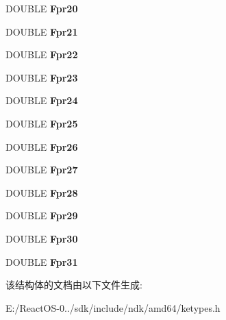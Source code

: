 \begin{DoxyCompactItemize}
D\+O\+U\+B\+LE {\bfseries Fpr20}
\item 
\mbox{\label{struct___k_e_x_c_e_p_t_i_o_n___f_r_a_m_e_a18daaaf2f1d4458a611526f331120393}} 
D\+O\+U\+B\+LE {\bfseries Fpr21}
\item 
\mbox{\label{struct___k_e_x_c_e_p_t_i_o_n___f_r_a_m_e_a5d1655c14daa3806512499e17ab2338f}} 
D\+O\+U\+B\+LE {\bfseries Fpr22}
\item 
\mbox{\label{struct___k_e_x_c_e_p_t_i_o_n___f_r_a_m_e_aa6454545c3d515529a9057ac41a22309}} 
D\+O\+U\+B\+LE {\bfseries Fpr23}
\item 
\mbox{\label{struct___k_e_x_c_e_p_t_i_o_n___f_r_a_m_e_a2157cc243c0ef31b487a44dc873d89eb}} 
D\+O\+U\+B\+LE {\bfseries Fpr24}
\item 
\mbox{\label{struct___k_e_x_c_e_p_t_i_o_n___f_r_a_m_e_ad96c0a9b514e2a08e14670d0f646b35a}} 
D\+O\+U\+B\+LE {\bfseries Fpr25}
\item 
\mbox{\label{struct___k_e_x_c_e_p_t_i_o_n___f_r_a_m_e_aad4cce522073605a0a951f5fd4324708}} 
D\+O\+U\+B\+LE {\bfseries Fpr26}
\item 
\mbox{\label{struct___k_e_x_c_e_p_t_i_o_n___f_r_a_m_e_a2e315c2f5de4ca7c23eb2e715a80148f}} 
D\+O\+U\+B\+LE {\bfseries Fpr27}
\item 
\mbox{\label{struct___k_e_x_c_e_p_t_i_o_n___f_r_a_m_e_aa5708ad7c1ae6ae4f048dd9e1714aa3b}} 
D\+O\+U\+B\+LE {\bfseries Fpr28}
\item 
\mbox{\label{struct___k_e_x_c_e_p_t_i_o_n___f_r_a_m_e_a46b99f81484526b855c5267eaafe59fc}} 
D\+O\+U\+B\+LE {\bfseries Fpr29}
\item 
\mbox{\label{struct___k_e_x_c_e_p_t_i_o_n___f_r_a_m_e_a73e709a5a8ec2157ecd3990a80a3459d}} 
D\+O\+U\+B\+LE {\bfseries Fpr30}
\item 
\mbox{\label{struct___k_e_x_c_e_p_t_i_o_n___f_r_a_m_e_a0b7506c7b8e815f6e487c8be4e56d5a5}} 
D\+O\+U\+B\+LE {\bfseries Fpr31}
\end{DoxyCompactItemize}


该结构体的文档由以下文件生成\+:\begin{DoxyCompactItemize}
\item 
E\+:/\+React\+O\+S-\/0../sdk/include/ndk/amd64/ketypes.\+h\end{DoxyCompactItemize}
